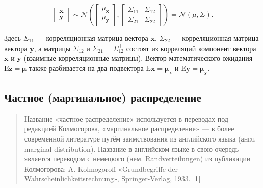 \documentclass[11pt,a4paper]{article}
\begin{document}
\[
\begin{bmatrix}
    \mathbf{x} \\
    \mathbf{y}
\end{bmatrix}
\sim
\mathcal{N}\left(
\begin{bmatrix}
    \mu_{\mathbf{x}} \\
    \mu_{\mathbf{y}}
\end{bmatrix},
\begin{bmatrix}
    \Sigma_{11} & \Sigma_{12} \\
    \Sigma_{21} & \Sigma_{22}
\end{bmatrix}
\right)
= \mathcal{N}(\mu, \Sigma).
\]

Здесь \(\Sigma_{11}\) --- корреляционная матрица вектора \(\mathbf{x}\),
\(\Sigma_{22}\) --- корреляционная матрица вектора \(\mathbf{y}\), а
матрицы \(\Sigma_{12}\) и \(\Sigma_{21} = \Sigma_{12}^\top\) состоят из
корреляций компонент вектора \(\mathbf{x}\) и \(\mathbf{y}\) (взаимные
корреляционные матрицы). Вектор математического ожидания
\(\mathrm{E}\mathbf{z} = \mathbf{\mu}\) также разбивается на два
подвектора \(\mathrm{E}\mathbf{x} = \mathbf{\mu_x}\) и
\(\mathrm{E}\mathbf{y} = \mathbf{\mu_y}\).

    \hypertarget{ux447ux430ux441ux442ux43dux44bux435-ux43cux430ux440ux433ux438ux43dux430ux43bux44cux43dux44bux435-ux440ux430ux441ux43fux440ux435ux434ux435ux43bux435ux43dux438ux44f}{%
\subsection{Частное (маргинальное)
распределение}\label{ux447ux430ux441ux442ux43dux44bux435-ux43cux430ux440ux433ux438ux43dux430ux43bux44cux43dux44bux435-ux440ux430ux441ux43fux440ux435ux434ux435ux43bux435ux43dux438ux44f}}

\begin{quote}
Название «частное распределение» используется в переводах под редакцией
Колмогорова, «маргинальное распределение» --- в более современной
литературе путём заимствования из английского языка (англ. marginal
distribution). Название в английском языке в свою очередь является
переводом с немецкого (нем. Randverteilungen) из публикации Колмогорова:
A. Kolmogoroff «Grundbegriffe der Wahrscheinlichkeitsrechnung»,
Springer-Verlag, 1933.
\href{https://ru.wikipedia.org/wiki/\%D0\%A7\%D0\%B0\%D1\%81\%D1\%82\%D0\%BD\%D0\%BE\%D0\%B5_\%D1\%80\%D0\%B0\%D1\%81\%D0\%BF\%D1\%80\%D0\%B5\%D0\%B4\%D0\%B5\%D0\%BB\%D0\%B5\%D0\%BD\%D0\%B8\%D0\%B5}{{[}1{]}}
\end{quote}
\end{document}
